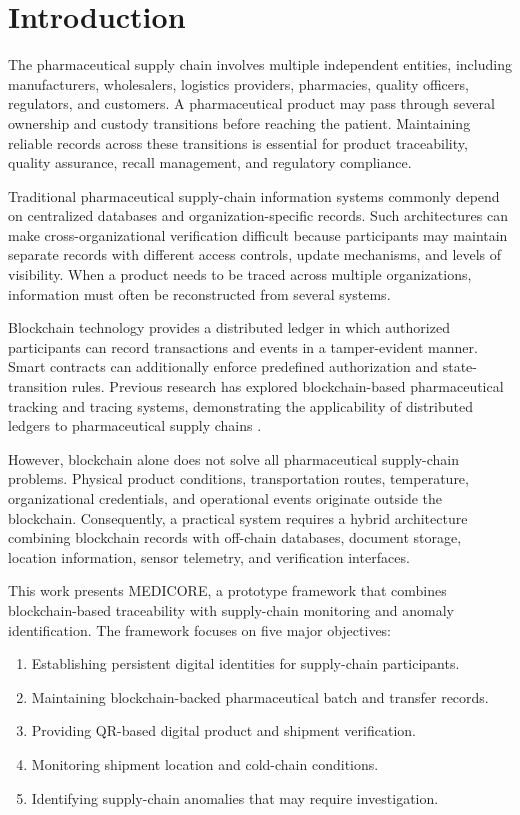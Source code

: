 \documentclass[11pt,a4paper]{article}
\begin{document}
\vspace{1.5em}

\section{Introduction}
The pharmaceutical supply chain involves multiple independent entities, including manufacturers, wholesalers, logistics providers, pharmacies, quality officers, regulators, and customers. A pharmaceutical product may pass through several ownership and custody transitions before reaching the patient. Maintaining reliable records across these transitions is essential for product traceability, quality assurance, recall management, and regulatory compliance.

Traditional pharmaceutical supply-chain information systems commonly depend on centralized databases and organization-specific records. Such architectures can make cross-organizational verification difficult because participants may maintain separate records with different access controls, update mechanisms, and levels of visibility. When a product needs to be traced across multiple organizations, information must often be reconstructed from several systems.

Blockchain technology provides a distributed ledger in which authorized participants can record transactions and events in a tamper-evident manner. Smart contracts can additionally enforce predefined authorization and state-transition rules. Previous research has explored blockchain-based pharmaceutical tracking and tracing systems, demonstrating the applicability of distributed ledgers to pharmaceutical supply chains \cite{liu2021blockchain,hosseini2021blockchain}.

However, blockchain alone does not solve all pharmaceutical supply-chain problems. Physical product conditions, transportation routes, temperature, organizational credentials, and operational events originate outside the blockchain. Consequently, a practical system requires a hybrid architecture combining blockchain records with off-chain databases, document storage, location information, sensor telemetry, and verification interfaces.

This work presents MEDICORE, a prototype framework that combines blockchain-based traceability with supply-chain monitoring and anomaly identification. The framework focuses on five major objectives:
\begin{enumerate}
    \item Establishing persistent digital identities for supply-chain participants.
    \item Maintaining blockchain-backed pharmaceutical batch and transfer records.
    \item Providing QR-based digital product and shipment verification.
    \item Monitoring shipment location and cold-chain conditions.
    \item Identifying supply-chain anomalies that may require investigation.
\end{enumerate}
\end{document}
